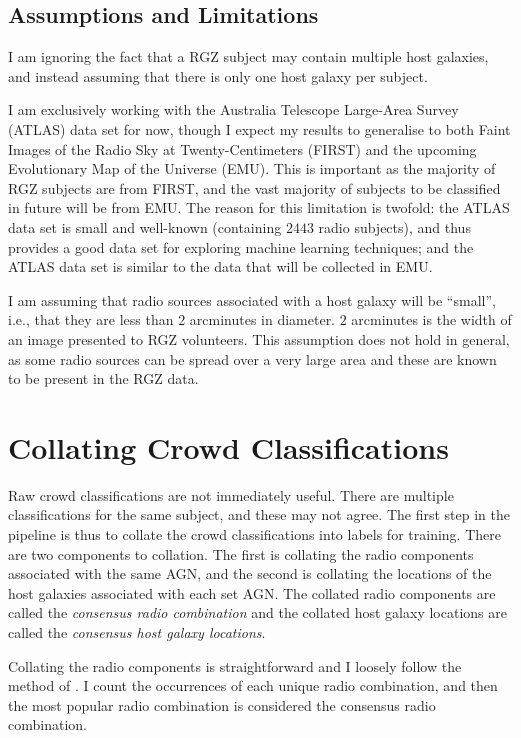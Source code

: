 \documentclass[a4paper]{article}
\begin{document}
        \subsection{Assumptions and Limitations}

            I am ignoring the fact that a RGZ subject may contain multiple host galaxies, and instead assuming that there is only one host galaxy per subject.

            I am exclusively working with the Australia Telescope Large-Area Survey (ATLAS)\citep{norris06} data set for now, though I expect my results to generalise to both Faint Images of the Radio Sky at Twenty-Centimeters (FIRST)\citep{becker95} and the upcoming Evolutionary Map of the Universe (EMU)\citep{norris11}. This is important as the majority of RGZ subjects are from FIRST, and the vast majority of subjects to be classified in future will be from EMU. The reason for this limitation is twofold: the ATLAS data set is small and well-known (containing $2443$ radio subjects), and thus provides a good data set for exploring machine learning techniques; and the ATLAS data set is similar to the data that will be collected in EMU\cite{banfield15}.

            I am assuming that radio sources associated with a host galaxy will be ``small'', i.e., that they are less than $2$ arcminutes in diameter. $2$ arcminutes is the width of an image presented to RGZ volunteers. This assumption does not hold in general, as some radio sources can be spread over a very large area and these are known to be present in the RGZ data\citep{banfield16}.

    \section{Collating Crowd Classifications}

        Raw crowd classifications are not immediately useful. There are multiple classifications for the same subject, and these may not agree. The first step in the pipeline is thus to collate the crowd classifications into labels for training. There are two components to collation. The first is collating the radio components associated with the same AGN, and the second is collating the locations of the host galaxies associated with each set AGN. The collated radio components are called the \emph{consensus radio combination} and the collated host galaxy locations are called the \emph{consensus host galaxy locations}.

        Collating the radio components is straightforward and I loosely follow the method of \citet{banfield15}. I count the occurrences of each unique radio combination, and then the most popular radio combination is considered the consensus radio combination.
\end{document}
